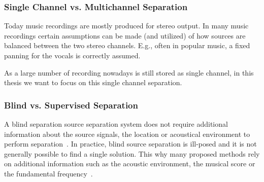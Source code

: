 \subsubsection*{Single Channel vs. Multichannel Separation}

Today music recordings are mostly produced for stereo output. 
In many music recordings certain assumptions can be made (and utilized) of how sources are balanced between the two stereo channels. 
E.g., often in popular music, a fixed panning for the vocals is correctly assumed.
\par
As a large number of recording nowadays is still stored as single channel, in this thesis we want to focus on this single channel separation.

\subsubsection*{Blind vs. Supervised Separation}
A blind separation source separation system does not require additional information about the source signals, the location or acoustical environment to perform separation~\cite{makino07}.
In practice, blind source separation is ill-posed and it is not generally possible to find a single solution.
This why many proposed methods rely on additional information such as the acoustic environment, the musical score or the fundamental frequency~\cite{liutkus13, ewert14}.

